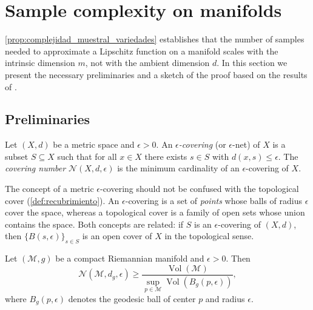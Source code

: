 \section{Sample complexity on manifolds}\label{sec:complejidad_muestral}

\autoref{prop:complejidad_muestral_variedades} establishes that the number of samples needed to approximate a Lipschitz function on a manifold scales with the intrinsic dimension $m$, not with the ambient dimension $d$. In this section we present the necessary preliminaries and a sketch of the proof based on the results of \citet{niyogi2008finding}.

\subsection{Preliminaries}\label{subsec:complejidad_muestral_preliminares}

\begin{definition}\label{def:numero_recubrimiento}
Let $(X, d)$ be a metric space and $\epsilon > 0$. An \textit{$\epsilon$-covering} (or $\epsilon$-net) of $X$ is a subset $S \subseteq X$ such that for all $x \in X$ there exists $s \in S$ with $d(x, s) \leq \epsilon$. The \textit{covering number} $\mathcal{N}(X, d, \epsilon)$ is the minimum cardinality of an $\epsilon$-covering of $X$.
\end{definition}

\begin{remark}\label{rem:recubrimiento_vs_topologico}
The concept of a metric $\epsilon$-covering should not be confused with the topological cover (\autoref{def:recubrimiento}). An $\epsilon$-covering is a set of \textit{points} whose balls of radius $\epsilon$ cover the space, whereas a topological cover is a family of open sets whose union contains the space. Both concepts are related: if $S$ is an $\epsilon$-covering of $(X,d)$, then $\{B(s, \epsilon)\}_{s \in S}$ is an open cover of $X$ in the topological sense.
\end{remark}

\begin{lemma}\label{lem:cota_volumetrica_recubrimiento}
Let $(\mathcal{M}, g)$ be a compact Riemannian manifold and $\epsilon > 0$. Then
\[
\mathcal{N}(\mathcal{M}, d_g, \epsilon) \geq \frac{\operatorname{Vol}(\mathcal{M})}{\sup_{p \in \mathcal{M}} \operatorname{Vol}(B_g(p, \epsilon))},
\]
where $B_g(p, \epsilon)$ denotes the geodesic ball of center $p$ and radius $\epsilon$.
\end{lemma}

